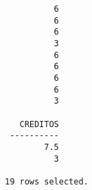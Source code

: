 \documentclass[11pt]{report}
\begin{document}
\begin{itemize}
\begin{verbatim}
          6                                                                                                                                                                                              
          6                                                                                                                                                                                              
          6                                                                                                                                                                                              
          3                                                                                                                                                                                              
          6                                                                                                                                                                                              
          6                                                                                                                                                                                              
          6                                                                                                                                                                                              
          6                                                                                                                                                                                              
          3                                                                                                                                                                                              

   CREDITOS                                                                                                                                                                                              
 ----------                                                                                                                                                                                              
        7.5                                                                                                                                                                                              
          3                                                                                                                                                                                              

19 rows selected.
  \end{verbatim}
\end{itemize}
\end{document}
